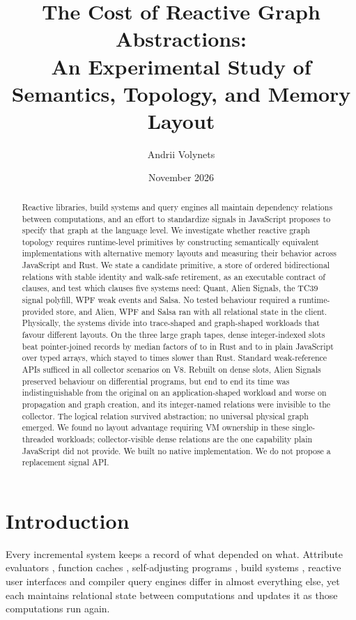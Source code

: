 \documentclass[11pt]{article}
\title{The Cost of Reactive Graph Abstractions:\\ An Experimental Study of Semantics, Topology, and Memory Layout}
\author{Andrii Volynets}
\date{November 2026}
\begin{document}
\maketitle

\begin{abstract}
Reactive libraries, build systems and query engines all maintain dependency relations between computations, and an effort to standardize signals in JavaScript proposes to specify that graph at the language level. We investigate whether reactive graph topology requires runtime-level primitives by constructing semantically equivalent implementations with alternative memory layouts and measuring their behavior across JavaScript and Rust. We state a candidate primitive, a store of ordered bidirectional relations with stable identity and walk-safe retirement, as an executable contract of \clauseCount{} clauses, and test which clauses five systems need: Quant, Alien Signals, the TC39 signal polyfill, WPF weak events and Salsa. No tested behaviour required a runtime-provided store, and Alien, WPF and Salsa ran with all relational state in the client. Physically, the systems divide into trace-shaped and graph-shaped workloads that favour different layouts. On the three large graph tapes, dense integer-indexed slots beat pointer-joined records by median factors of \rustRatioMin{} to \rustRatioMax{} in Rust and \jsRatioMin{} to \jsRatioMax{} in plain JavaScript over typed arrays, which stayed \jsOverRustMin{} to \jsOverRustMax{} times slower than Rust. Standard weak-reference APIs sufficed in all \gcScenarios{} collector scenarios on V8. Rebuilt on dense slots, Alien Signals preserved behaviour on \mSixPrograms{} differential programs, but end to end its time was indistinguishable from the original on an application-shaped workload and worse on propagation and graph creation, and its integer-named relations were invisible to the collector. The logical relation survived abstraction; no universal physical graph emerged. We found no layout advantage requiring VM ownership in these single-threaded workloads; collector-visible dense relations are the one capability plain JavaScript did not provide. We built no native implementation. We do not propose a replacement signal API.
\end{abstract}

\section{Introduction}

Every incremental system keeps a record of what depended on what. Attribute evaluators \cite{demers1981,hudson1991}, function caches \cite{pugh1989}, self-adjusting programs \cite{acar2006}, build systems \cite{erdweg2015,mokhov2020}, reactive user interfaces \cite{elliott1997,cooper2006,czaplicki2013,bainomugisha2013} and compiler query engines \cite{salsa} differ in almost everything else, yet each maintains relational state between computations and updates it as those computations run again.
\end{document}
